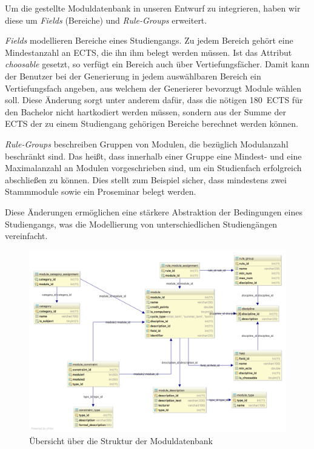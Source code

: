 Um die gestellte Moduldatenbank in unseren Entwurf zu integrieren, haben wir diese um \textit{Fields} (Bereiche) und \textit{Rule-Groups} erweitert.

\textit{Fields} modellieren Bereiche eines Studiengangs. Zu jedem Bereich gehört eine Mindestanzahl an ECTS, die ihn ihm belegt werden müssen. Ist das Attribut \textit{choosable} gesetzt, so verfügt ein Bereich auch über Vertiefungsfächer. Damit kann der Benutzer bei der Generierung in jedem auswählbaren Bereich ein Vertiefungsfach angeben, aus welchem der Generierer bevorzugt Module wählen soll. Diese Änderung sorgt unter anderem dafür, dass die nötigen 180~ECTS für den Bachelor nicht hartkodiert werden müssen, sondern aus der Summe der ECTS der zu einem Studiengang gehörigen Bereiche berechnet werden können.

\textit{Rule-Groups} beschreiben Gruppen von Modulen, die bezüglich Modulanzahl beschränkt sind. Das heißt, dass innerhalb einer Gruppe eine Mindest- und eine Maximalanzahl an Modulen vorgeschrieben sind, um ein Studienfach erfolgreich abschließen zu können. Dies stellt zum Beispiel sicher, dass mindestens zwei Stammmodule sowie ein Proseminar belegt werden.

Diese Änderungen ermöglichen eine stärkere Abstraktion der Bedingungen eines Studiengangs, was die Modellierung von unterschiedlichen Studiengängen vereinfacht.

\begin{figure}
	\includegraphics[width = \textwidth]{diagrams/module_diagram.png}
	\caption{Übersicht über die Struktur der Moduldatenbank}
\end{figure}